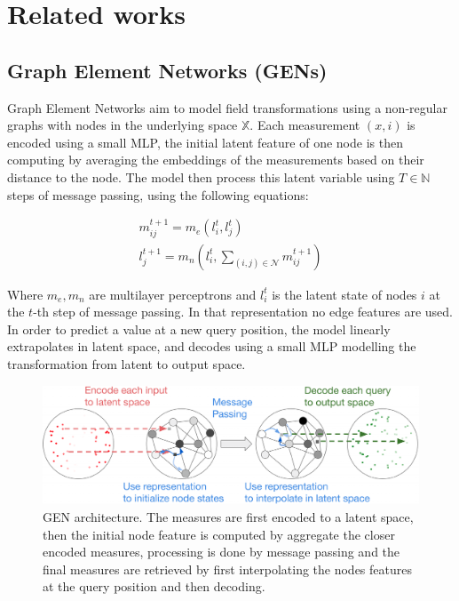 \documentclass[a4paper,10pt]{article}
\begin{document}
\section{Related works}


\subsection{Graph Element Networks (GENs)} \label{ssec:gen}
Graph Element Networks \cite{alet2019gen} aim to model field transformations using a non-regular graphs with nodes in the underlying space $\mathbb{X}$. Each measurement $(x, i)$ is encoded using a small MLP, the initial latent feature of one node is then computing by averaging the embeddings of the measurements based on their distance to the node. The model then process this latent variable using $T \in \mathbb{N}$ steps of message passing, using the following equations:

\begin{align}
  m_{ij}^{t + 1} = m_e(l_{i}^{t}, l_{j}^{t}) \\
  l_{j}^{t + 1} = m_{n}(l_{i}^{t}, \sum_{(i,j) \in \mathcal{N}} m_{ij}^{t + 1})
\end{align}

Where $m_e, m_n$ are multilayer perceptrons and $l_{i}^{t}$ is the latent state of nodes $i$ at the $t$-th step of message passing. In that representation no edge features are used.
In order to predict a value at a new query position, the model linearly extrapolates in latent space, and decodes using a small MLP modelling the transformation from latent to output space.

\begin{figure}[htbp]
  \centering
  \includegraphics[width=\textwidth]{GEN}
  \caption{GEN architecture. The measures are first encoded to a latent space, then the initial node feature is computed by aggregate the closer encoded measures, processing is done by message passing and the final measures are retrieved by first interpolating the nodes features at the query position and then decoding.}
\end{figure}
\end{document}
